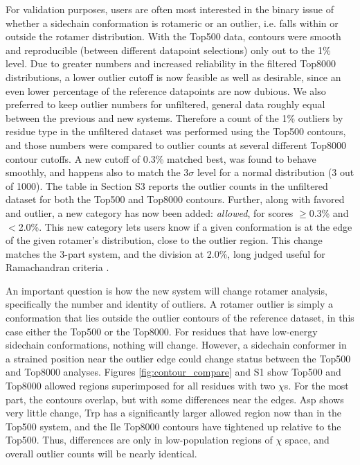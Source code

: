 For validation purposes, users are often most interested in the binary issue of whether a sidechain conformation is rotameric or an outlier, i.e. falls within or outside the rotamer distribution. With the Top500 data, contours were smooth and reproducible (between different datapoint selections) only out to the 1\% level. Due to greater numbers and increased reliability in the filtered Top8000 distributions, a lower outlier cutoff is now feasible as well as desirable, since an even lower percentage of the reference datapoints are now dubious. We also preferred to keep outlier numbers for unfiltered, general data roughly equal between the previous and new systems. Therefore a count of the 1\% outliers by residue type in the unfiltered dataset was performed using the Top500 contours, and those numbers were compared to outlier counts at several different Top8000 contour cutoffs. A new cutoff of 0.3\% matched best, was found to behave smoothly, and happens also to match the 3$\sigma$ level for a normal distribution (3 out of 1000). \textcolor{changecolor}{The table in Section S3 reports the outlier counts in the unfiltered dataset for both the Top500 and Top8000 contours.} Further, along with favored and outlier, a new category has now been added: \textit{allowed}, for scores $\ge$0.3\% and $<$2.0\%. This new category lets users know if a given conformation is at the edge of the given rotamer's distribution, close to the outlier region. This change matches the 3-part system, and the division at 2.0\%, long judged useful for Ramachandran criteria \cite{Kleywegt1996, Hooft1996, Lovell:2003uq}.

An important question is how the new system will change rotamer analysis, specifically the number and identity of outliers. A rotamer outlier is simply a conformation that lies outside the outlier contours of the reference dataset, in this case either the Top500 or the Top8000. For residues that have low-energy sidechain conformations, nothing will change. However, a sidechain conformer in a strained position near the outlier edge could change status between the Top500 and Top8000 analyses. Figure\textcolor{changecolor}{s} \ref{fig:contour_compare} \textcolor{changecolor}{and S1 show} Top500 and Top8000 allowed regions superimposed for \textcolor{changecolor}{all residues with two $\chi$s}. For the most part, the contours overlap, but with some differences near the edges. Asp shows very little change, Trp has a significantly larger allowed region now than in the Top500 system, and the Ile Top8000 contours have tightened up relative to the Top500. Thus, differences are only in low-population regions of $\chi$ space, and overall outlier counts will be nearly identical.

